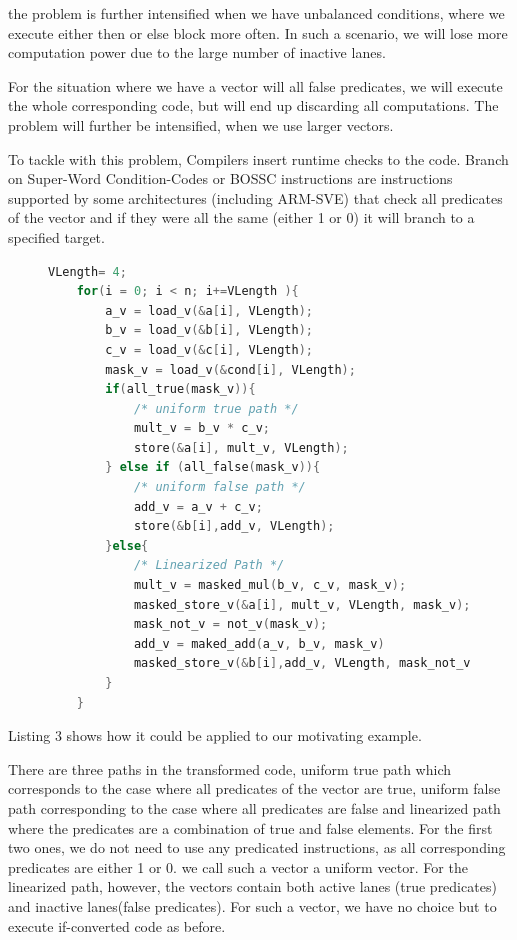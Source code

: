 the problem is further intensified when we have unbalanced conditions, where we execute either then or else block more often. In such a scenario, we will lose more computation power due to the large number of inactive lanes.

 For the situation where we have a vector will all false predicates, we will execute the whole corresponding code, but will end up discarding all computations. The problem will further be intensified, when we use larger vectors.

 To tackle with this problem, Compilers insert runtime checks to the code. Branch on Super-Word Condition-Codes or BOSSC instructions are instructions supported by some architectures (including ARM-SVE) that check all predicates of the vector and if they were all the same (either 1 or 0) it will branch to a specified target.


\begin{figure}[t]
\begin{lstlisting}[language=C, caption={Inserting Run-Time Checks}]
    VLength= 4;
    for(i = 0; i < n; i+=VLength ){
        a_v = load_v(&a[i], VLength);
        b_v = load_v(&b[i], VLength);
        c_v = load_v(&c[i], VLength);
        mask_v = load_v(&cond[i], VLength);
        if(all_true(mask_v)){
            /* uniform true path */
            mult_v = b_v * c_v;
            store(&a[i], mult_v, VLength);
        } else if (all_false(mask_v)){
            /* uniform false path */
            add_v = a_v + c_v;
            store(&b[i],add_v, VLength);
        }else{
            /* Linearized Path */
            mult_v = masked_mul(b_v, c_v, mask_v);
            masked_store_v(&a[i], mult_v, VLength, mask_v);
            mask_not_v = not_v(mask_v);
            add_v = maked_add(a_v, b_v, mask_v)
            masked_store_v(&b[i],add_v, VLength, mask_not_v);
        }
    }

\end{lstlisting}
\label{fig:mycode}
\end{figure}


Listing 3 shows how it could be applied to our motivating example.

There are three paths in the transformed code, uniform true path which corresponds to the case where all predicates of the vector are true, uniform false path corresponding to the case where all predicates are false and linearized path where the predicates are a combination of true and false elements. For the first two ones, we do not need to use any predicated instructions, as all corresponding predicates are either 1 or 0. we call such a vector a uniform vector. For the linearized path, however, the vectors contain both active lanes (true predicates) and inactive lanes(false predicates). For such a vector, we have no choice but to execute if-converted code as before.

